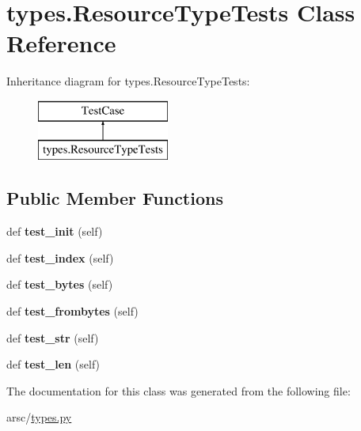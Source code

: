 \hypertarget{classtypes_1_1ResourceTypeTests}{}\section{types.\+Resource\+Type\+Tests Class Reference}
\label{classtypes_1_1ResourceTypeTests}
Inheritance diagram for types.\+Resource\+Type\+Tests\+:\begin{figure}[H]
\begin{center}
\leavevmode
\includegraphics[height=2.000000cm]{classtypes_1_1ResourceTypeTests}
\end{center}
\end{figure}
\subsection*{Public Member Functions}
\begin{DoxyCompactItemize}
\item 
\mbox{\label{classtypes_1_1ResourceTypeTests_a749405ae4645e45be4f64bcaee62feda}} 
def {\bfseries test\+\_\+init} (self)
\item 
\mbox{\label{classtypes_1_1ResourceTypeTests_a1421d92c2255b37332409c70bb9c1f2d}} 
def {\bfseries test\+\_\+index} (self)
\item 
\mbox{\label{classtypes_1_1ResourceTypeTests_aa31887b8308e069e5464ab0ff39bcc33}} 
def {\bfseries test\+\_\+bytes} (self)
\item 
\mbox{\label{classtypes_1_1ResourceTypeTests_ab5802d1f342eb2a9635b993dce9bc9a2}} 
def {\bfseries test\+\_\+frombytes} (self)
\item 
\mbox{\label{classtypes_1_1ResourceTypeTests_a68459ec16b61f7a8b02ba1e342300ff7}} 
def {\bfseries test\+\_\+str} (self)
\item 
\mbox{\label{classtypes_1_1ResourceTypeTests_abf50344a1567fd10f7671fd1434c7d17}} 
def {\bfseries test\+\_\+len} (self)
\end{DoxyCompactItemize}


The documentation for this class was generated from the following file\+:\begin{DoxyCompactItemize}
\item 
arsc/\mbox{\hyperlink{types_8py}{types.\+py}}\end{DoxyCompactItemize}
